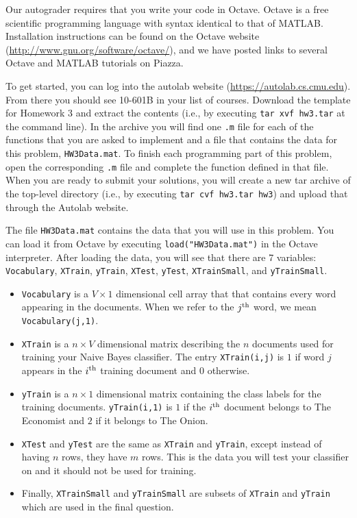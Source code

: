 \documentclass{article}
\newcommand \code [1]{{\tt #1}}
\begin{document}
Our autograder requires that you write your code in Octave. Octave is
a free scientific programming language with syntax identical to that
of MATLAB. Installation instructions can be found on the Octave
website (\url{http://www.gnu.org/software/octave/}), and we have
posted links to several Octave and MATLAB tutorials on Piazza.

To get started, you can log into the autolab website
(\url{https://autolab.cs.cmu.edu}). From there you should see 10-601B
in your list of courses. Download the template for Homework 3 and
extract the contents (i.e., by executing \code{tar xvf hw3.tar} at the
command line). In the archive you will find one \code{.m} file for
each of the functions that you are asked to implement and a file that
contains the data for this problem, \code{HW3Data.mat}. To finish each
programming part of this problem, open the corresponding \code{.m}
file and complete the function defined in that file. When you are
ready to submit your solutions, you will create a new tar archive of
the top-level directory (i.e., by executing \code{tar cvf hw3.tar
  hw3}) and upload that through the Autolab website.

The file \code{HW3Data.mat} contains the data that you will use in
this problem. You can load it from Octave by executing
\code{load("HW3Data.mat")} in the Octave interpreter. After loading
the data, you will see that there are 7 variables: \code{Vocabulary},
\code{XTrain}, \code{yTrain}, \code{XTest}, \code{yTest},
\code{XTrainSmall}, and \code{yTrainSmall}.
\begin{itemize}
\item \code{Vocabulary} is a $V\times 1$ dimensional cell array that
  that contains every word appearing in the documents. When we refer
  to the $j^{\rm th}$ word, we mean \code{Vocabulary(j,1)}.
\item \code{XTrain} is a $n \times V$ dimensional matrix describing
  the $n$ documents used for training your Naive Bayes classifier. The
  entry \code{XTrain(i,j)} is $1$ if word $j$ appears in the
  $i^{\rm th}$ training document and $0$ otherwise.
\item \code{yTrain} is a $n \times 1$ dimensional matrix containing
  the class labels for the training documents. \code{yTrain(i,1)} is
  $1$ if the $i^{\rm th}$ document belongs to The Economist and $2$ if
  it belongs to The Onion.
\item \code{XTest} and \code{yTest} are the same as \code{XTrain} and
  \code{yTrain}, except instead of having $n$ rows, they have $m$
  rows. This is the data you will test your classifier on and it
  should not be used for training.
\item Finally, \code{XTrainSmall} and \code{yTrainSmall} are subsets
  of \code{XTrain} and \code{yTrain} which are used in the final
  question.
\end{itemize}
\end{document}
